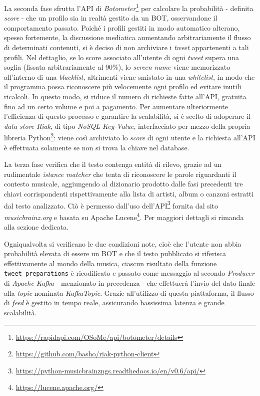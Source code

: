 \documentclass[12pt, a4paper, twocolumn]{article} %
\begin{document}
La seconda fase sfrutta l'API di \textit{Botometer}\footnote{\url{https://rapidapi.com/OSoMe/api/botometer/details}} per calcolare la probabilità - definita \textit{score} - che un profilo sia in realtà gestito da un BOT, osservandone il comportamento passato.
Poiché i profili gestiti in modo automatico alterano, spesso fortemente, la discussione mediatica aumentando arbitrariamente il flusso di determinati contenuti, si è deciso di non archiviare i \textit{tweet} appartenenti a tali profili. 
Nel dettaglio, se lo score associato all'utente di ogni \textit{tweet} supera una soglia (fissata arbitrariamente al $90\%$), lo \textit{screen name} viene memorizzato all'interno di una \textit{blacklist}, altrimenti viene smistato in una \textit{whitelist}, in modo che il programma possa riconoscere più velocemente ogni profilo ed evitare inutili ricalcoli.
In questo modo, si riduce il numero di richieste fatte all'API, gratuita fino ad un certo volume e poi a pagamento.
Per aumentare ulteriormente l'efficienza di questo processo e garantire la scalabilità, si è scelto di adoperare il \textit{data store Riak}, di tipo \textit{NoSQL Key-Value}, interfacciato per mezzo della propria libreria Python\footnote{\url{https://github.com/basho/riak-python-client}}\cite{riakTutorial}: viene così archiviato lo \textit{score} di ogni utente e la richiesta all'API è effettuata solamente se non si trova la chiave nel database.

La terza fase verifica che il testo contenga entità di rilevo, grazie ad un rudimentale \textit{istance matcher} che tenta di riconoscere le parole riguardanti il contesto musicale, aggiungendo al dizionario prodotto dalle fasi precedenti tre chiavi corrispondenti rispettivamente alla lista di artisti, album o canzoni estratti dal testo analizzato.
Ciò è permesso dall'uso dell'API\footnote{\url{https://python-musicbrainzngs.readthedocs.io/en/v0.6/api/}} fornita dal sito \textit{musicbrainz.org} e basata su Apache Lucene\footnote{\url{https://lucene.apache.org/}}.
Per maggiori dettagli si rimanda alla sezione dedicata.

Ogniqualvolta si verificano le due condizioni note, cioè che l'utente non abbia probabilità elevata di essere un BOT e che il testo pubblicato si riferisca effettivamente al mondo della musica, ciascun risultato della funzione \verb|tweet_preparations| è ricodificato e passato come messaggio al secondo \textit{Producer} di \textit{Apache Kafka} - menzionato in precedenza - che effettuerà l'invio del dato finale alla \textit{topic} nominata \textit{KafkaTopic}. 
Grazie all'utilizzo di questa piattaforma, il flusso di \textit{feed} è gestito in tempo reale, assicurando bassissima latenza e grande scalabilità. 
\end{document}
